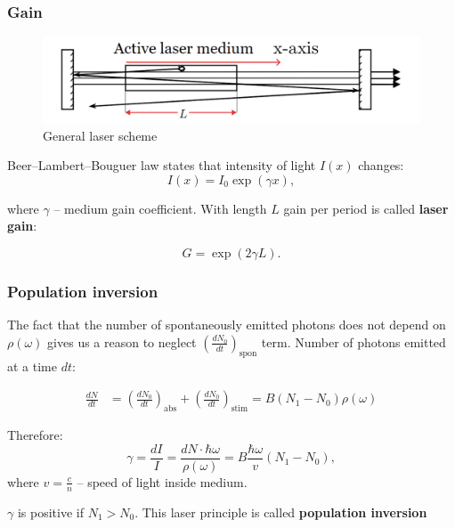 \documentclass{beamer}
\begin{document}
	\begin{frame}
	\frametitle{Gain}
	
	\begin{figure}
		\centering
		\includegraphics[width=1\linewidth]{res/general_laser_scheme.pdf}
		\caption{General laser scheme}
		\label{fig:general_laser_scheme}
	\end{figure}
	Beer–Lambert–Bouguer law states that intensity of light $I(x)$ changes:
	$$I(x) = I_0 \exp({\gamma x}),$$
	
	where $\gamma$ -- medium gain coefficient. With length $L$ gain per period is called \textbf{laser gain}:
	
	$$G = \exp{(2\gamma L)}.$$
	\end{frame}
	
	\begin{frame}
		\frametitle{Population inversion}
		The fact that the number of spontaneously emitted photons does not depend on  $\rho(\omega)$ gives us a reason to neglect $\left(\frac{dN_0}{dt}\right)_{\text{spon}}$ term. Number of photons emitted at a time $dt$:
		
		\begin{equation} \label{eq1}
			\begin{split}
				\frac{dN}{dt} & = \left(\frac{dN_0}{dt}\right)_{\text{abs}} + \left(\frac{dN_0}{dt}\right)_{\text{stim}} =  B (N_1 - N_0) \rho(\omega)
			\end{split}
		\end{equation}

		Therefore:
		\begin{equation}
			\gamma = \frac{dI}{I} = \frac{dN \cdot \hbar\omega}{\rho(\omega)} = B\frac{\hbar\omega }{v} (N_1 - N_0), 
		\end{equation}
		where $v = \frac{c}{n}$ -- speed of light inside medium.
		
		\vspace*{20px}
		\centering
		$\gamma$ is positive if $N_1 > N_0$. This laser principle is called \textbf{population inversion}
	\end{frame}
\end{document}
